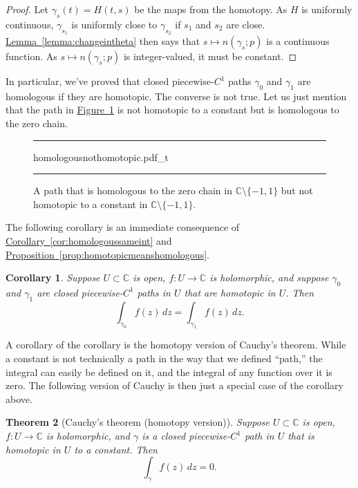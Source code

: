 \documentclass[12pt,openany]{book}
\newcommand{\C}{{\mathbb{C}}}
\newcommand{\myquote}[1]{``#1''}
\theoremstyle{plain}
\newtheorem{thm}{Theorem}[section]
\newtheorem{cor}[thm]{Corollary}
\theoremstyle{remark}
\theoremstyle{definition}
\newenvironment{myfig}{%
\begin{figure}[h!t]
\noindent\rule{\textwidth}{0.5pt}\vspace{12pt}\par\centering}%
{\par\noindent\rule{\textwidth}{0.5pt}
\end{figure}}
\theoremstyle{exercise}
\theoremstyle{example}
\newcommand{\figureref}[1]{\hyperref[#1]{Figure~\ref*{#1}}}
\newcommand{\propref}[1]{\hyperref[#1]{Proposition~\ref*{#1}}}
\newcommand{\lemmaref}[1]{\hyperref[#1]{Lemma~\ref*{#1}}}
\newcommand{\corref}[1]{\hyperref[#1]{Corollary~\ref*{#1}}}
\begin{document}
\begin{proof}
Let $\gamma_s(t) = H(t,s)$ be the maps from the homotopy.
As $H$ is uniformly continuous, $\gamma_{s_1}$
is uniformly close to $\gamma_{s_2}$ if $s_1$ and $s_2$ are close.
\lemmaref{lemma:changeintheta} then says that $s \mapsto n(\gamma_s;p)$ is a
continuous function.  As $s \mapsto n(\gamma_s;p)$ is integer-valued, it must
be constant.
\end{proof}

In particular, we've proved that closed piecewise-$C^1$ paths
$\gamma_0$ and $\gamma_1$ are homologous if
they are homotopic.  The converse is not true.  Let us just mention that 
the path in \figureref{fig:homologousnothomotopic} 
is not homotopic to a constant but is homologous to the zero chain.

\begin{myfig}
{homologousnothomotopic.pdf_t}
\caption{A path that is homologous to the zero chain in $\C \setminus \{
-1,1\}$ but not homotopic to a constant in
$\C \setminus \{ -1,1 \}$.\label{fig:homologousnothomotopic}}
\end{myfig}

The following corollary is an immediate consequence
of \corref{cor:homologoussameint} and
\propref{prop:homotopicmeanshomologous}.

\begin{cor}
Suppose $U \subset \C$ is open, $f \colon U \to \C$ is holomorphic,
and suppose $\gamma_0$ and $\gamma_1$ are closed
piecewise-$C^1$ paths in $U$ that are homotopic in $U$.  Then
\begin{equation*}
\int_{\gamma_0} f(z) \, dz = \int_{\gamma_1} f(z) \, dz .
\end{equation*}
\end{cor}

A corollary of the corollary is the homotopy version of Cauchy's theorem.
While a constant is not technically a path in the way that we defined
\myquote{path,} the integral can easily be defined on it,
and the integral of any function over it is zero.
The following version of Cauchy
is then just a special case of the corollary above.

\begin{thm}[Cauchy's theorem (homotopy version)]
\label{thm:cauchyhomotopy}%
%
Suppose $U \subset \C$ is open, $f \colon U \to \C$ is holomorphic,
and $\gamma$ is a closed piecewise-$C^1$ path in $U$ that is homotopic in $U$ to a
constant.  Then
\begin{equation*}
\int_{\gamma} f(z) \, dz = 0 .
\end{equation*}
\end{thm}
\end{document}
